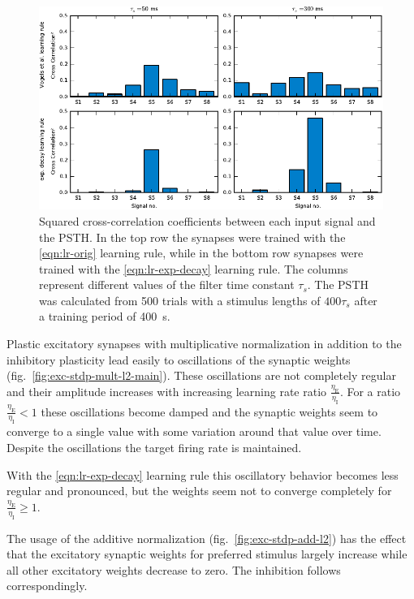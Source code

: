 \documentclass[11pt,a4paper]{scrartcl}
\newcommand{\I}[1]{_{\text{I}#1}}
\newcommand{\E}[1]{_{\text{E}#1}}
\begin{document}
\begin{figure}
    \centering
    \includegraphics{figures/correlations}
    \caption{Squared cross-correlation coefficients between each input signal 
        and the PSTH. In the top row the synapses were trained with the 
        \ref{eqn:lr-orig} learning rule, while in the bottom row synapses were 
        trained with the \ref{eqn:lr-exp-decay} learning rule. The columns 
        represent different values of the filter time constant $\tau_s$. The 
        PSTH was calculated from \num{500} trials with a stimulus lengths of 
        $400 \tau_s$ after a training period of \SI{400}{\second}.}
    \label{fig:correlations}
\end{figure}

Plastic excitatory synapses with multiplicative normalization in addition to the 
inhibitory plasticity lead easily to oscillations of the synaptic weights 
(fig.~\ref{fig:exc-stdp-mult-l2-main}).  These oscillations are not completely 
regular and their amplitude increases with increasing learning rate ratio 
$\frac{\eta\E{}}{\eta\I{}}$. For a ratio $\frac{\eta\E{}}{\eta\I{}} < 1$ these 
oscillations become damped and the synaptic weights seem to converge to a single 
value with some variation around that value over time. Despite the oscillations 
the target firing rate is maintained.

With the \ref{eqn:lr-exp-decay} learning rule this oscillatory behavior becomes 
less regular and pronounced, but the weights seem not to converge completely for 
$\frac{\eta\E{}}{\eta\I{}} \geq 1$.

The usage of the additive normalization (fig.~\ref{fig:exc-stdp-add-l2}) has the 
effect that the excitatory synaptic weights for preferred stimulus largely 
increase while all other excitatory weights decrease to zero. The inhibition 
follows correspondingly.
\end{document}
